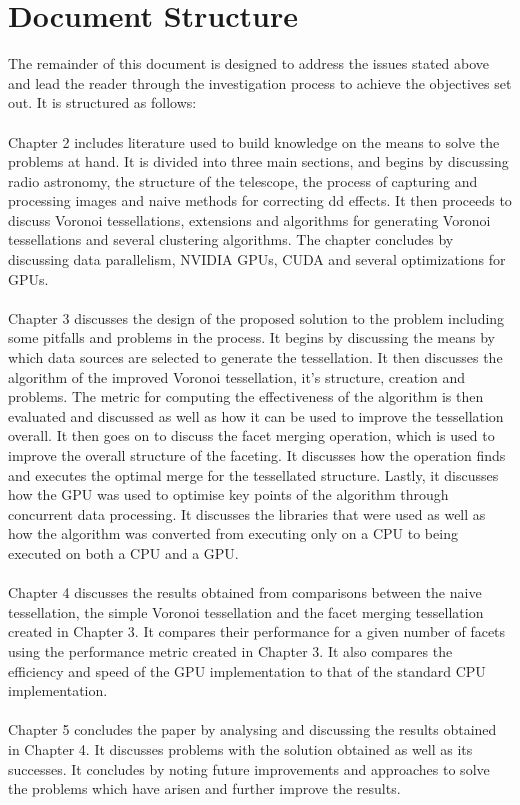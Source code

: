 \section{Document Structure}
The remainder of this document is designed to address the issues stated above and lead the reader through the investigation process to achieve the objectives set out. It is structured as follows:
\\
\\
Chapter 2 includes literature used to build knowledge on the means to solve the problems at hand. It is divided into three main sections, and begins by discussing radio astronomy, the structure of the telescope, the process of capturing and processing images and naive methods for correcting \gls{dd} effects. It then proceeds to discuss Voronoi tessellations, extensions and algorithms for generating Voronoi tessellations and several clustering algorithms. The chapter concludes by discussing data parallelism, NVIDIA GPUs, CUDA and several optimizations for GPUs.
\\
\\
Chapter 3 discusses the design of the proposed solution to the problem including some pitfalls and problems in the process. It begins by discussing the means by which data sources are selected to generate the tessellation. It then discusses the algorithm of the improved Voronoi tessellation, it's structure, creation and problems. The metric for computing the effectiveness of the algorithm is then evaluated and discussed as well as how it can be used to improve the tessellation overall. It then goes on to discuss the facet merging operation, which is used to improve the overall structure of the faceting. It discusses how the operation finds and executes the optimal merge for the tessellated structure. Lastly, it discusses how the GPU was used to optimise key points of the algorithm through concurrent data processing. It discusses the libraries that were used as well as how the algorithm was converted from executing only on a CPU to being executed on both a CPU and a GPU.
\\
\\
Chapter 4 discusses the results obtained from comparisons between the naive tessellation, the simple Voronoi tessellation and the facet merging tessellation created in Chapter 3. It compares their performance for a given number of facets using the performance metric created in Chapter 3. It also compares the efficiency and speed of the GPU implementation to that of the standard CPU implementation.
\\
\\
Chapter 5 concludes the paper by analysing and discussing the results obtained in Chapter 4. It discusses problems with the solution obtained as well as its successes. It concludes by noting future improvements and approaches to solve the problems which have arisen and further improve the results.
